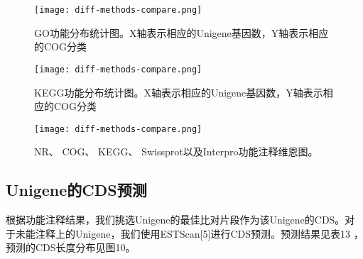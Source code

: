 \documentclass[10pt,oneside,a4paper]{article}	%
\begin{document}
\begin{figure}[H]
\centering
\texttt{[image: diff-methods-compare.png]}
\par
\caption{GO功能分布统计图。X轴表示相应的Unigene基因数，Y轴表示相应的COG分类}\label{fig:GO}\par
\end{figure}
\par
\vspace{5 mm}

\begin{figure}[H]
\centering
\texttt{[image: diff-methods-compare.png]}
\par
\caption{KEGG功能分布统计图。X轴表示相应的Unigene基因数，Y轴表示相应的COG分类}\label{fig:KEGG}\par
\end{figure}
\par
\vspace{5 mm}

\begin{figure}[H]
\centering
\texttt{[image: diff-methods-compare.png]}
\par
\caption{NR、 COG、 KEGG、 Swissprot以及Interpro功能注释维恩图。}\label{fig:FunctionVenn}\par
\end{figure}
\par
\vspace{5 mm}

\subsection{Unigene的CDS预测}
根据功能注释结果，我们挑选Unigene的最佳比对片段作为该Unigene的CDS。对于未能注释上的Unigene，我们使用ESTScan[5]进行CDS预测。预测结果见表13 ，预测的CDS长度分布见图10。
\par
\vspace{5 mm}
\end{document}
